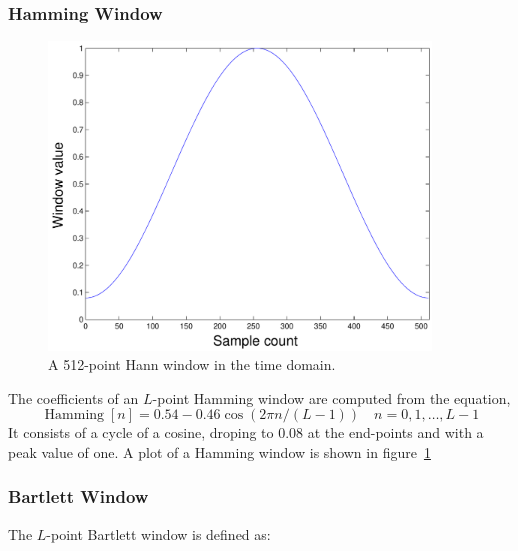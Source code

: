 \subsubsection{Hamming Window}

\begin{figure}
\centerline{\includegraphics[width=4in]{ch-fft/ufft_hamming_w512}}
\caption{A 512-point Hann window in the time domain.\label{fig:ufft-hmw}}
\end{figure}

The
coefficients of an $L$-point Hamming window are computed from the
equation,
\begin{equation}
\operatorname{Hamming}[n]
    = 0.54 - 0.46 \cos(2\pi n/(L-1))
          \quad n=0,1,\ldots,L-1
\label{eq:ufft-hnw}
\end{equation}
It consists of a cycle of a cosine, droping to 0.08 at the end-points
and with a peak value of one. A plot of a Hamming window is shown in
figure~\ref{fig:ufft-hmw}

\subsubsection{Bartlett Window}

The $L$-point Bartlett window is defined as:

